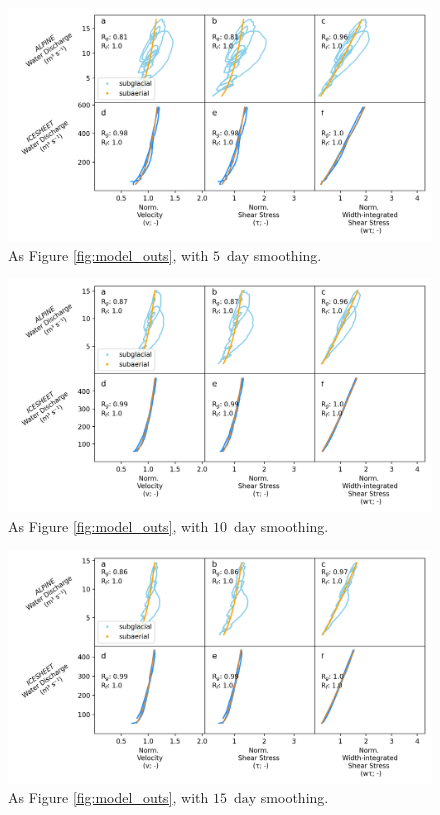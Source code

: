 \documentclass[draft]{agujournal2019}
\newcommand{\unit}[1]{$\mathrm{#1}$}
\begin{document}
\begin{center}
  \begin{figure}[!h]
    \includegraphics[width=0.7\linewidth]{Fig3_5day.png}
    \caption{As Figure \ref{fig:model_outs}, with $5$ \,\unit{day} smoothing.}
    \label{fig:model_outs_5day}
  \end{figure}
\end{center}

\begin{center}
  \begin{figure}[!h]
    \includegraphics[width=0.7\linewidth]{Fig3_10day.png}
    \caption{As Figure \ref{fig:model_outs}, with $10$ \,\unit{day} smoothing.}
    \label{fig:model_outs_10day}
  \end{figure}
\end{center}

\begin{center}
  \begin{figure}[!h]
    \includegraphics[width=0.7\linewidth]{Fig3_15day.png}
    \caption{As Figure \ref{fig:model_outs}, with $15$ \,\unit{day} smoothing.}
    \label{fig:model_outs_15day}
  \end{figure}
\end{center}
\FloatBarrier
\end{document}
